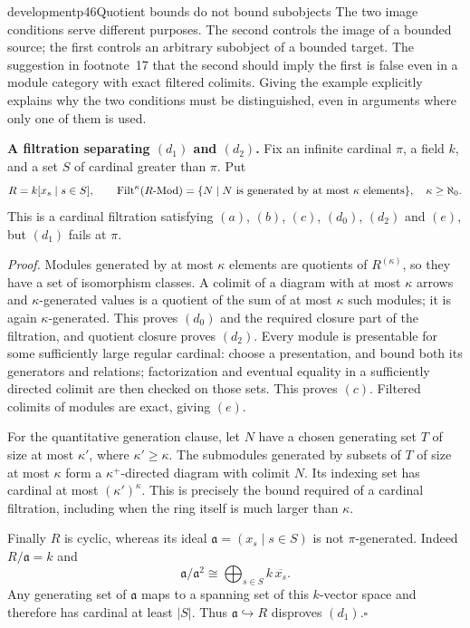 \begin{dcomment}{development}{p46}{Quotient bounds do not bound subobjects}
The two image conditions serve different purposes. The second controls the image of a bounded source; the first controls an arbitrary subobject of a bounded target. The suggestion in footnote~17 that the second should imply the first is false even in a module category with exact filtered colimits. Giving the example explicitly explains why the two conditions must be distinguished, even in arguments where only one of them is used.

\textbf{A filtration separating $(d_1)$ and $(d_2)$.}\ours
Fix an infinite cardinal $\pi$, a field $k$, and a set $S$ of cardinal greater than $\pi$. Put
\[
 R=k[x_s\mid s\in S],\qquad
 \mathrm{Filt}^{\kappa}(R\text{-}\mathrm{Mod})
 =\{N\mid N\text{ is generated by at most }\kappa\text{ elements}\},
 \quad \kappa\geq\aleph_0.
\]
This is a cardinal filtration satisfying $(a)$, $(b)$, $(c)$, $(d_0)$, $(d_2)$ and $(e)$, but $(d_1)$ fails at $\pi$.

\emph{Proof.} Modules generated by at most $\kappa$ elements are quotients of $R^{(\kappa)}$, so they have a set of isomorphism classes. A colimit of a diagram with at most $\kappa$ arrows and $\kappa$-generated values is a quotient of the sum of at most $\kappa$ such modules; it is again $\kappa$-generated. This proves $(d_0)$ and the required closure part of the filtration, and quotient closure proves $(d_2)$. Every module is presentable for some sufficiently large regular cardinal: choose a presentation, and bound both its generators and relations; factorization and eventual equality in a sufficiently directed colimit are then checked on those sets. This proves $(c)$. Filtered colimits of modules are exact, giving $(e)$.

For the quantitative generation clause, let $N$ have a chosen generating set $T$ of size at most $\kappa'$, where $\kappa'\geq\kappa$. The submodules generated by subsets of $T$ of size at most $\kappa$ form a $\kappa^+$-directed diagram with colimit $N$. Its indexing set has cardinal at most $(\kappa')^{\kappa}$. This is precisely the bound required of a cardinal filtration, including when the ring itself is much larger than $\kappa$.

Finally $R$ is cyclic, whereas its ideal $\mathfrak a=(x_s\mid s\in S)$ is not $\pi$-generated. Indeed $R/\mathfrak a=k$ and
\[
 \mathfrak a/\mathfrak a^2\cong\bigoplus_{s\in S}k\,\overline{x_s}.
\]
Any generating set of $\mathfrak a$ maps to a spanning set of this $k$-vector space and therefore has cardinal at least $|S|$. Thus $\mathfrak a\hookrightarrow R$ disproves $(d_1)$.\hfill$\square$


\end{dcomment}
